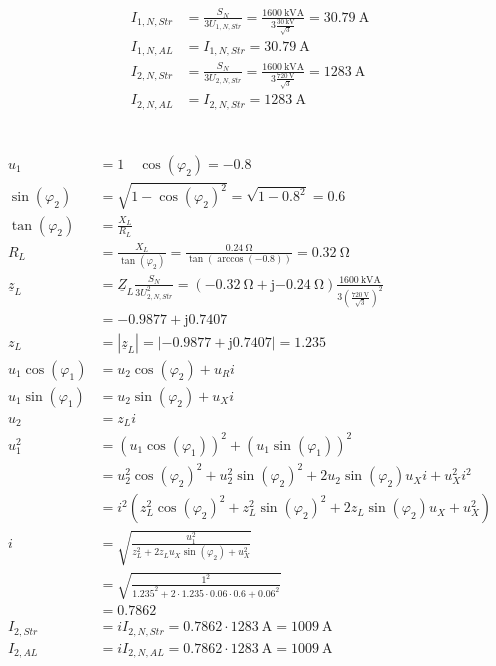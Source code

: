 \documentclass[11pt,a4paper]{scrartcl}
\newcommand{\mybr}[1]{\left(#1\right)}
\renewcommand{\j}{\mathrm{j}}
\newcommand{\Z}{\underline{Z}}
\newcommand{\z}{\underline{z}}
\newcommand{\0}{_{\mybr{0}}}
\newcommand{\1}{_{\mybr{1}}}
\newcommand{\2}{_{\mybr{2}}}
\newcommand{\ISS}{I_{2,Str}}
\newcommand{\ISA}{I_{2,AL}}
\newcommand{\UPNS}{U_{1,N,Str}}
\newcommand{\USNS}{U_{2,N,Str}}
\newcommand{\IPNS}{I_{1,N,Str}}
\newcommand{\ISNS}{I_{2,N,Str}}
\newcommand{\IPNA}{I_{1,N,AL}}
\newcommand{\ISNA}{I_{2,N,AL}}
\newcommand{\ce}{\cos\mybr{\varphi_1}}
\newcommand{\se}{\sin\mybr{\varphi_1}}
\newcommand{\cz}{\cos\mybr{\varphi_2}}
\newcommand{\sz}{\sin\mybr{\varphi_2}}
\begin{document}
\section{}
\begin{align}
\IPNS&=\frac{S_N}{3\UPNS}=\frac{\SI{1600}{\kilo\volt\ampere}}{3\frac{\SI{30}{\kilo\volt}}{\sqrt{3}}}=\SI{30.79}{\ampere}\\
\IPNA&=\IPNS=\SI{30.79}{\ampere}\\
\ISNS&=\frac{S_N}{3\USNS}=\frac{\SI{1600}{\kilo\volt\ampere}}{3\frac{\SI{720}{\volt}}{\sqrt{3}}}=\SI{1283}{\ampere}\\
\ISNA&=\ISNS=\SI{1283}{\ampere}
\end{align}

\section{}
\subsection{}
\begin{align}
u_1&=1\quad\cz=\num{-0.8}\\
\sz&=\sqrt{1-\cz^2}=\sqrt{1-\num{0.8}^2}=0.6\\
\tan\mybr{\varphi_2}&=\frac{X_L}{R_L}\\
R_L&=\frac{X_L}{\tan\mybr{\varphi_2}}=\frac{\SI{0.24}{\ohm}}{\tan\mybr{\arccos\mybr{\num{-0.8}}}}=\SI{0.32}{\ohm}\\
\z_L&=\Z_L\frac{S_N}{3\USNS^2}=\mybr{\SI{-0.32}{\ohm}+\j\SI{-0.24}{\ohm}}\frac{\SI{1600}{\kilo\volt\ampere}}{3\mybr{\frac{\SI{720}{\volt}}{\sqrt{3}}}^2}\\
&=\num{-0.9877}+\j\num{0.7407}\\
z_L&=\left|\z_L\right|=\left|\num{-0.9877}+\j\num{0.7407}\right|=\num{1.235}\\
u_1\ce&=u_2\cz+u_R i\\
u_1\se&=u_2\sz+u_X i\\
u_2&=z_L i\\
u_1^2&=\mybr{u_1\ce}^2+\mybr{u_1\se}^2\\
&=u_2^2\cz^2+u_2^2\sz^2+2 u_2\sz u_X i+u_X^2 i^2\\
&=i^2\mybr{z_L^2\cz^2+z_L^2\sz^2+2 z_L\sz u_X+u_X^2}\\
i&=\sqrt{\frac{u_1^2}{z_L^2+2 z_L u_X \sz+u_X^2}}\\
&=\sqrt{\frac{1^2}{\num{1.235}^2+2\cdot\num{1.235}\cdot\num{0.06}\cdot\num{0.6}+\num{0.06}^2}}\\
&=\num{0.7862}\\
\ISS&=i\ISNS=\num{0.7862}\cdot\SI{1283}{\ampere}=\SI{1009}{\ampere}\\
\ISA&=i\ISNA=\num{0.7862}\cdot\SI{1283}{\ampere}=\SI{1009}{\ampere}
\end{align}
\end{document}
